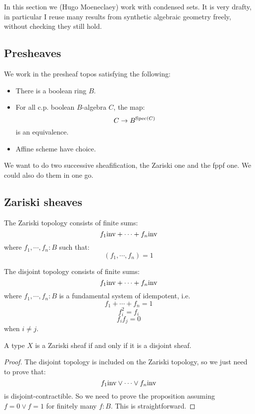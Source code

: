 In this section we (Hugo Moeneclaey) work with condensed sets. It is very drafty, in particular I reuse many results from synthetic algebraic geometry freely, without checking they still hold.


\subsection{Presheaves}

We work in the presheaf topos satisfying the following:

\begin{itemize}
\item There is a boolean ring $B$.
\item For all c.p. boolean $B$-algebra $C$, the map:
\[C \to B^{\operatorname{Spec}(C)}\]
is an equivalence.
\item Affine scheme have choice.
\end{itemize}

We want to do two successive sheafification, the Zariski one and the fppf one. We could also do them in one go.


\subsection{Zariski sheaves}

\begin{definition}
The Zariski topology consists of finite sums:
\[f_1 \mathrm{inv} + \cdots + f_n \mathrm{inv}\]
where $f_1,\cdots,f_n:B$ such that:
\[(f_1,\cdots,f_n) = 1\]
\end{definition}

\begin{definition}
The disjoint topology consists of finite sums:
\[f_1 \mathrm{inv} + \cdots + f_n \mathrm{inv}\]
where $f_1,\cdots,f_n:B$ is a fundamental system of idempotent, i.e.
\[f_1+\cdots+f_n = 1\]
\[f_i^2 = f_i\]
\[f_if_j = 0\]
when $i\not=j$.
\end{definition}

\begin{lemma}
A type $X$ is a Zariski sheaf if and only if it is a disjoint sheaf.
\end{lemma}

\begin{proof}
The disjoint topology is included on the Zariski topology, so we just need to prove that:
\[f_1 \mathrm{inv} \lor \cdots \lor f_n \mathrm{inv}\]
is disjoint-contractible. So we need to prove the proposition assuming $f=0\lor f=1$ for finitely many $f:B$. This is straightforward.
\end{proof}

